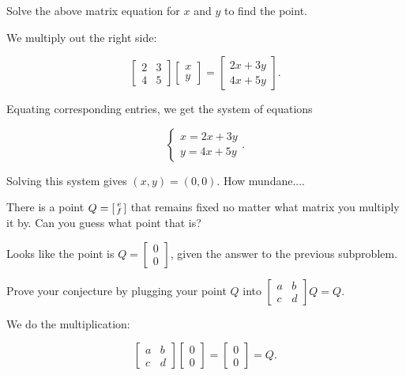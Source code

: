 \documentclass[../key.tex]{subfiles}
\begin{document}
\begin{inner_problem}[start=1]
\item Solve the above matrix equation for $x$ and $y$ to find the point.
\end{inner_problem}

We multiply out the right side:

$$\begin{bmatrix}2 & 3 \\ 4 & 5 \end{bmatrix} \begin{bmatrix} x \\ y \end{bmatrix} = \begin{bmatrix}2x + 3y \\ 4x + 5y \end{bmatrix}.$$

Equating corresponding entries, we get the system of equations

$$\begin{cases} x = 2x + 3y \\ y = 4x + 5y \end{cases}.$$

Solving this system gives $(x,y)=(0,0)$. How mundane....

\begin{inner_problem}
\item There is a point $Q=\begin{bsmallmatrix}e \\ f \end{bsmallmatrix}$ that remains fixed no matter what matrix you multiply it by. Can you guess what point that is?
\end{inner_problem}

Looks like the point is $Q=\begin{bmatrix} 0 \\ 0 \end{bmatrix}$, given the answer to the previous subproblem.

\begin{inner_problem}
\item Prove your conjecture by plugging your point $Q$ into $\left[\begin{array}{cc}a & b \\ c & d\end{array}\right]Q=Q$.
\end{inner_problem}

We do the multiplication:

$$\begin{bmatrix} a & b \\ c & d \end{bmatrix} \begin{bmatrix} 0 \\ 0 \end{bmatrix} = \begin{bmatrix} 0 \\ 0 \end{bmatrix} = Q.$$
\end{document}
